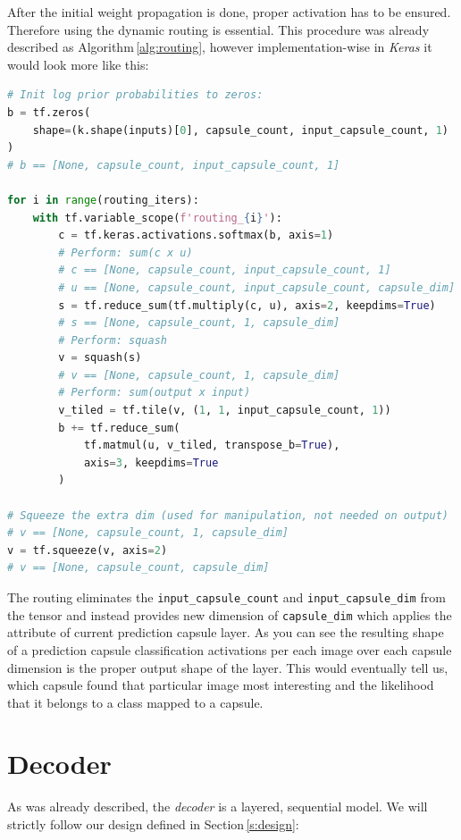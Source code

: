 After the initial weight propagation is done, proper activation has to be ensured. Therefore using the dynamic routing is essential. This procedure was already described as Algorithm\,\ref{alg:routing}, however implementation-wise in \textit{Keras} it would look more like this:

\begin{lstlisting}[language=Python, caption=Prediction capsule routing]
# Init log prior probabilities to zeros:
b = tf.zeros(
    shape=(k.shape(inputs)[0], capsule_count, input_capsule_count, 1)
)
# b == [None, capsule_count, input_capsule_count, 1]

for i in range(routing_iters):
    with tf.variable_scope(f'routing_{i}'):
        c = tf.keras.activations.softmax(b, axis=1)
        # Perform: sum(c x u)
        # c == [None, capsule_count, input_capsule_count, 1]
        # u == [None, capsule_count, input_capsule_count, capsule_dim]
        s = tf.reduce_sum(tf.multiply(c, u), axis=2, keepdims=True)
        # s == [None, capsule_count, 1, capsule_dim]
        # Perform: squash
        v = squash(s)
        # v == [None, capsule_count, 1, capsule_dim]
        # Perform: sum(output x input)
        v_tiled = tf.tile(v, (1, 1, input_capsule_count, 1))
        b += tf.reduce_sum(
            tf.matmul(u, v_tiled, transpose_b=True),
            axis=3, keepdims=True
        )

# Squeeze the extra dim (used for manipulation, not needed on output)
# v == [None, capsule_count, 1, capsule_dim]
v = tf.squeeze(v, axis=2)
# v == [None, capsule_count, capsule_dim]
\end{lstlisting}

The routing eliminates the \texttt{input\_capsule\_count} and \texttt{input\_capsule\_dim} from the tensor and instead provides new dimension of \texttt{capsule\_dim} which applies the attribute of current prediction capsule layer. As you can see the resulting shape of a prediction capsule classification activations per each image over each capsule dimension is the proper output shape of the layer. This would eventually tell us, which capsule found that particular image most interesting and the likelihood that it belongs to a class mapped to a capsule.

\section{Decoder}

As was already described, the \textit{decoder} is a layered, sequential model. We will strictly follow our design defined in Section\,\ref{s:design}:


